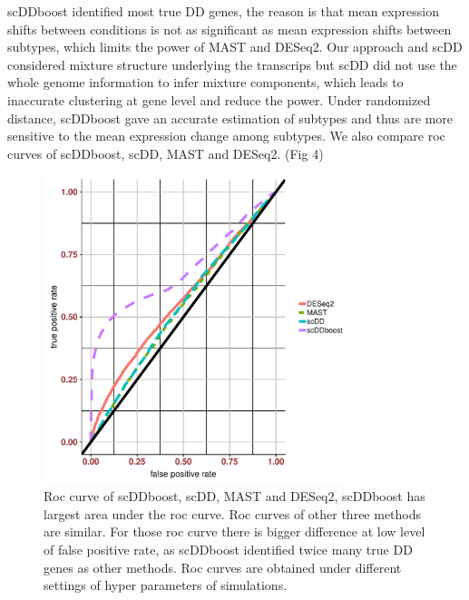 \documentclass[aoas,preprint]{imsart}
\begin{document}
scDDboost identified most true DD genes, the reason is that mean expression shifts between conditions is not as significant as mean expression shifts between subtypes, which limits the power of MAST and DESeq2. Our approach and scDD considered mixture structure underlying the transcrips but scDD did not use the whole genome information to infer mixture components, which leads to inaccurate clustering at gene level and reduce the power. Under randomized distance, scDDboost gave an accurate estimation of subtypes and thus are more sensitive to the mean expression change among subtypes. We also compare roc curves of scDDboost, scDD, MAST and DESeq2. (Fig 4)


\begin{figure}[H]
  \includegraphics[width = 0.8\textwidth]{Figs/roc.pdf}
  \caption{Roc curve of scDDboost, scDD, MAST and DESeq2, scDDboost has largest area under the roc curve. Roc curves of other three methods are similar. For those roc curve there is bigger difference at low level of false positive rate, as scDDboost identified twice many true DD genes as other methods.  Roc curves are obtained under different settings of hyper parameters of simulations.}
  \label{fig:5}
\end{figure}


\end{document}
